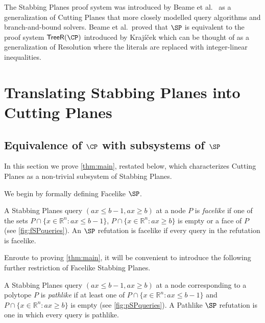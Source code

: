 The Stabbing Planes proof system was introduced by Beame et al.~\cite{BeameFIKPPR18} as a generalization of Cutting Planes that more closely modelled query algorithms and branch-and-bound solvers.
Beame et al.~proved that $\SP$ is equivalent to the proof system $\mathsf{TreeR}(\CP)$ introduced by Kraj\'{i}\v{c}ek \cite{Krajicek98} which can be thought of as a generalization of Resolution where the literals are replaced with integer-linear inequalities.






\section{Translating Stabbing Planes into Cutting Planes} 
\label{sec:SP}

\subsection{Equivalence of \texorpdfstring{$\CP$}{CP} with subsystems of
  \texorpdfstring{$\SP$}{SP}}
\label{sec:facelikesp-sim}

In this section we prove \autoref{thm:main}, restated below, which characterizes Cutting Planes as a non-trivial subsystem of Stabbing Planes.

\main*

We begin by formally defining Facelike $\SP$.
\begin{definition}
	A Stabbing Planes query $(ax \leq b-1, ax \geq b)$ at a node $P$ is \emph{facelike} if one of the sets $P \cap \{x \in \mathbb{R}^n: ax \leq b-1\}$, $P \cap \{x \in \mathbb{R}^n: ax \geq b\}$ is empty or a face of $P$ (see \autoref{fig:fSPqueries}).
	An $\SP$ refutation is facelike if every query in the refutation is facelike. 
\end{definition}

Enroute to proving \autoref{thm:main}, it will be convenient to introduce the following further restriction of Facelike Stabbing Planes.

\begin{definition}
	A Stabbing Planes query $(ax \leq b-1, ax \geq b)$ at a node corresponding to a polytope $P$ is \emph{pathlike} if at least one of $P \cap \{x \in \mathbb{R}^n: ax \leq b-1\}$ and $P \cap \{x \in \mathbb{R}^n: ax \geq b\}$ is empty (see \autoref{fig:pSPqueries}). A Pathlike $\SP$ refutation is one in which every query is pathlike. 
\end{definition}

